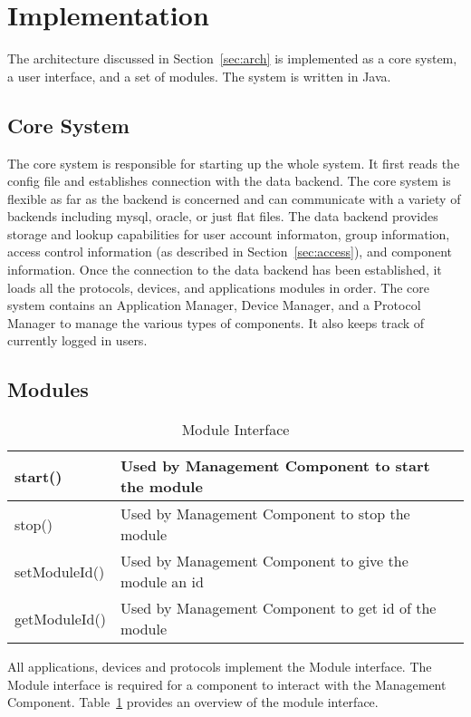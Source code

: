\section{Implementation}
\label{sec:implementation}
The architecture discussed in Section~\ref{sec:arch} is implemented as a core
system, a user interface, and a set of modules. The system is written in Java.
\subsection{Core System}
\label{sec:core}
The core system is responsible for starting up the whole system. It first reads
the config file and establishes connection with the data backend. The core
system is flexible as far as the backend is concerned and can communicate with
a variety of backends including mysql, oracle, or just flat files. The data
backend provides storage and lookup capabilities for user account informaton,
group information, access control information (as described in
Section~\ref{sec:access}), and component information. Once the connection to
the data backend has been established, it loads all the protocols, devices, and
applications modules in order. The core system contains an Application Manager,
Device Manager, and a Protocol Manager to manage the various types of
components. It also keeps track of currently logged in users.
\subsection{Modules}
\label{sec:modules}
\begin{table}
\begin{center}
\begin{tabular}{| l | p{5cm} |}
\hline
start() & Used by Management Component to start the module \\ \hline
stop() & Used by Management Component to stop the module \\ \hline
setModuleId() & Used by Management Component to give the module an id \\ \hline
getModuleId() & Used by Management Component to get id of the module \\ \hline
\end{tabular}
\end{center}
\caption{Module Interface}
\label{tab:module}
\end{table}
All applications, devices and protocols implement the Module interface. The
Module interface is required for a component to interact with the Management 
Component. Table~\ref{tab:module} provides an overview of the module interface.
